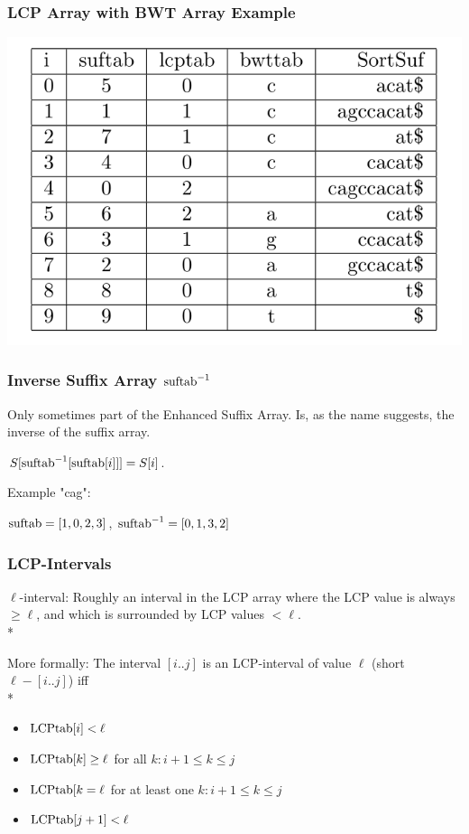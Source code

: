 \documentclass[compress,handout]{beamer} %
\begin{document}
\begin{frame}
	\frametitle{LCP Array with BWT Array Example}
        \includegraphics[width=\textwidth, height=\textheight, keepaspectratio=true]{esa_with_bwttab_example}
\end{frame}

\begin{frame}
	\frametitle{Inverse Suffix Array $\hbox{suftab}^{-1}$}
	Only sometimes part of the Enhanced Suffix Array.
	Is, as the name suggests, the inverse of the suffix array.

	$S[\hbox{suftab}^{-1}[\hbox{suftab}[i]]]=S[i]$.

	Example "cag":

	$\hbox{suftab}=[1,0,2,3]$, $\hbox{suftab}^{-1}=[0,1,3,2]$
\end{frame}

\begin{frame}
	\frametitle{LCP-Intervals}
	$\ell$-interval: Roughly an interval in the LCP array where the LCP value is always
	$\ge \ell$, and which is surrounded by LCP values $< \ell$.\\*

	\vspace{5mm}
	More formally:
	The interval $[i..j]$ is an LCP-interval of value $\ell$ (short $\ell-[i..j]$)
	iff \\*
	\begin{itemize}
		\item $\hbox{LCPtab}[i]<\ell$
		\item $\hbox{LCPtab}[k]\ge \ell$ for all $k: i+1 \le k \le j$
		\item $\hbox{LCPtab}[k=\ell$ for at least one $k: i+1 \le k \le j$
		\item $\hbox{LCPtab}[j+1]<\ell$
	\end{itemize}
\end{frame}
\end{document}

